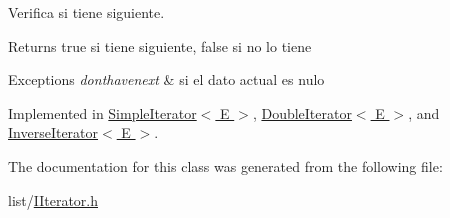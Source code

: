Verifica si tiene siguiente. 

\begin{DoxyReturn}{Returns}
true si tiene siguiente, false si no lo tiene 
\end{DoxyReturn}

\begin{DoxyExceptions}{Exceptions}
{\em donthavenext} & si el dato actual es nulo \\
\hline
\end{DoxyExceptions}


Implemented in \hyperlink{class_simple_iterator_ab946b3d707e32d4d53f15af201ea2113}{Simple\-Iterator$<$ E $>$}, \hyperlink{class_double_iterator_adb5ef4c66649e0a4ce18e38cd85904ed}{Double\-Iterator$<$ E $>$}, and \hyperlink{class_inverse_iterator_a86973781dfa84df67be2843fc4545692}{Inverse\-Iterator$<$ E $>$}.



The documentation for this class was generated from the following file\-:\begin{DoxyCompactItemize}
\item 
list/\hyperlink{_i_iterator_8h}{I\-Iterator.\-h}\end{DoxyCompactItemize}

